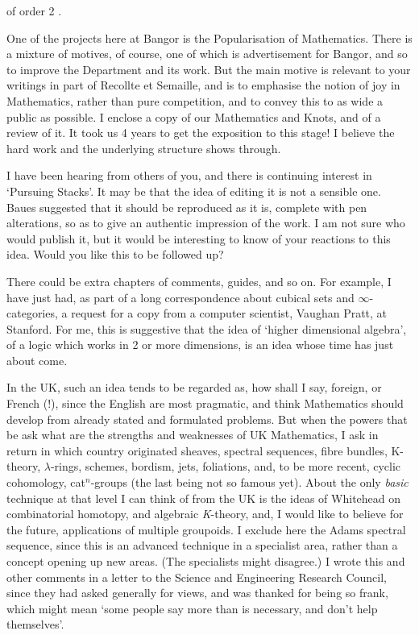 of order 2 .

One of the projects here at Bangor is the Popularisation of
Mathematics. There is a mixture of motives, of course, one of which is
advertisement for Bangor, and so to improve the Department and its work.
But the main motive is relevant to your writings in part of Recollte et
Semaille, and is to emphasise the notion of joy in Mathematics, rather than
pure competition, and to convey this to as wide a public as possible. I
enclose a copy of our Mathematics and Knots, and of a review of it. It took
us 4 years to get the exposition to this stage! I believe the hard work and
the underlying structure shows through.

I have been hearing from others of you, and there is continuing
interest in `Pursuing Stacks'. It may be that the idea of editing it is not
a sensible one. Baues suggested that it should be reproduced as it is,
complete with pen alterations, so as to give an authentic impression of the
work. I am not sure who would publish it, but it would be interesting to
know of your reactions to this idea. Would you like this to be
followed up?

There could be extra chapters of comments, guides, and so on. For
example, I have just had, as part of a long correspondence about cubical
sets and $\infty$-categories, a request for a copy from a computer scientist,
Vaughan Pratt, at Stanford. For me, this is suggestive that the idea of
`higher dimensional algebra', of a logic which works in 2 or more
dimensions, is an idea whose time has just about come.

In the UK, such an idea tends to be regarded as, how shall I say,
foreign, or French (!), since the English are most pragmatic, and think
Mathematics should develop from already stated and formulated problems. But
when the powers that be ask what are the strengths and weaknesses of UK
Mathematics, I ask in return in which country originated sheaves, spectral
sequences, fibre bundles, K-theory, $\lambda$-rings, schemes, bordism, jets,
foliations, and, to be more recent, cyclic cohomology, cat$^{n}$-groups (the last
being not so famous yet). About the only \textit{basic} technique at that level I
can think of from the UK is the ideas of Whitehead on combinatorial
homotopy, and algebraic \textit{K}-theory, and, I would like to believe for the
future, applications of multiple groupoids. I exclude here the Adams
spectral sequence, since this is an advanced technique in a specialist area,
rather than a concept opening up new areas. (The specialists might
disagree.) I wrote this and other comments in a letter to the Science and
Engineering Research Council, since they had asked generally for views, and
was thanked for being so frank, which might mean `some people say more than
is necessary, and don't help themselves'.

